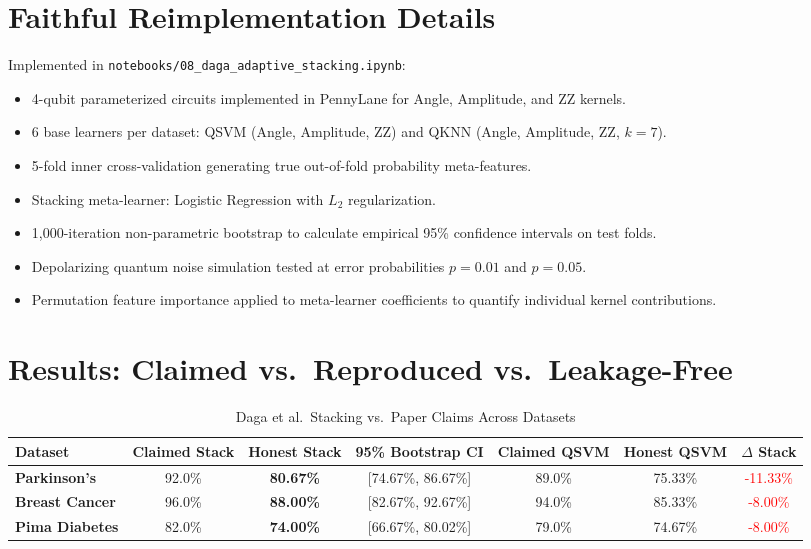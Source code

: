 \documentclass[12pt,a4paper]{article}
\begin{document}
\section{Faithful Reimplementation Details}
Implemented in \texttt{notebooks/08\_daga\_adaptive\_stacking.ipynb}:
\begin{itemize}[leftmargin=*]
  \item 4-qubit parameterized circuits implemented in PennyLane for Angle, Amplitude, and ZZ kernels.
  \item 6 base learners per dataset: QSVM (Angle, Amplitude, ZZ) and QKNN (Angle, Amplitude, ZZ, $k=7$).
  \item 5-fold inner cross-validation generating true out-of-fold probability meta-features.
  \item Stacking meta-learner: Logistic Regression with $L_2$ regularization.
  \item 1,000-iteration non-parametric bootstrap to calculate empirical 95\% confidence intervals on test folds.
  \item Depolarizing quantum noise simulation tested at error probabilities $p = 0.01$ and $p = 0.05$.
  \item Permutation feature importance applied to meta-learner coefficients to quantify individual kernel contributions.
\end{itemize}

\section{Results: Claimed vs.\ Reproduced vs.\ Leakage-Free}
\begin{table}[h!]
  \centering
  \caption{Daga et al.\ Stacking vs.\ Paper Claims Across Datasets}
  \begin{tabular}{lcccccc}
    \toprule
    \textbf{Dataset} & \textbf{Claimed Stack} & \textbf{Honest Stack} & \textbf{95\% Bootstrap CI} & \textbf{Claimed QSVM} & \textbf{Honest QSVM} & \textbf{$\Delta$ Stack}\\
    \midrule
    \textbf{Parkinson's} & 92.0\% & \textbf{80.67\%} & [74.67\%, 86.67\%] & 89.0\% & 75.33\% & \textcolor{red}{-11.33\%}\\
    \textbf{Breast Cancer}& 96.0\% & \textbf{88.00\%} & [82.67\%, 92.67\%] & 94.0\% & 85.33\% & \textcolor{red}{-8.00\%}\\
    \textbf{Pima Diabetes}& 82.0\% & \textbf{74.00\%} & [66.67\%, 80.02\%] & 79.0\% & 74.67\% & \textcolor{red}{-8.00\%}\\
    \bottomrule
  \end{tabular}
\end{table}
\end{document}
